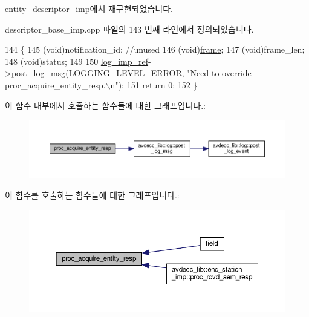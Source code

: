 \hyperlink{classavdecc__lib_1_1entity__descriptor__imp_a934de13d0b017574d514ce276180a004}{entity\+\_\+descriptor\+\_\+imp}에서 재구현되었습니다.



descriptor\+\_\+base\+\_\+imp.\+cpp 파일의 143 번째 라인에서 정의되었습니다.


\begin{DoxyCode}
144 \{
145     (void)notification\_id; \textcolor{comment}{//unused}
146     (void)\hyperlink{gst__avb__playbin_8c_ac8e710e0b5e994c0545d75d69868c6f0}{frame};
147     (void)frame\_len;
148     (void)status;
149 
150     \hyperlink{namespaceavdecc__lib_acbe3e2a96ae6524943ca532c87a28529}{log\_imp\_ref}->\hyperlink{classavdecc__lib_1_1log_a68139a6297697e4ccebf36ccfd02e44a}{post\_log\_msg}(\hyperlink{namespaceavdecc__lib_a501055c431e6872ef46f252ad13f85cdaf2c4481208273451a6f5c7bb9770ec8a}{LOGGING\_LEVEL\_ERROR}, \textcolor{stringliteral}{"Need to
       override proc\_acquire\_entity\_resp.\(\backslash\)n"});
151     \textcolor{keywordflow}{return} 0;
152 \}
\end{DoxyCode}


이 함수 내부에서 호출하는 함수들에 대한 그래프입니다.\+:
\nopagebreak
\begin{figure}[H]
\begin{center}
\leavevmode
\includegraphics[width=350pt]{classavdecc__lib_1_1descriptor__base__imp_a934de13d0b017574d514ce276180a004_cgraph}
\end{center}
\end{figure}




이 함수를 호출하는 함수들에 대한 그래프입니다.\+:
\nopagebreak
\begin{figure}[H]
\begin{center}
\leavevmode
\includegraphics[width=350pt]{classavdecc__lib_1_1descriptor__base__imp_a934de13d0b017574d514ce276180a004_icgraph}
\end{center}
\end{figure}


